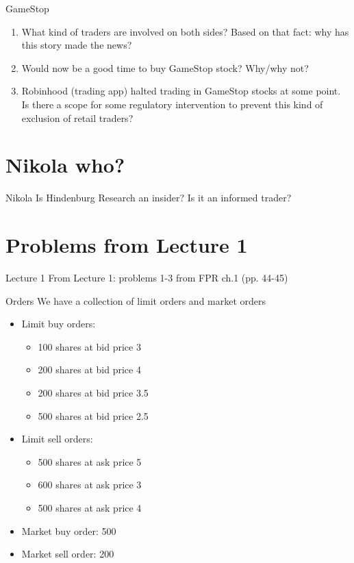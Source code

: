 \documentclass[english,10pt
,aspectratio=169
]{beamer}
\begin{document}
\begin{frame}{GameStop}
	\begin{enumerate}
		\item What kind of traders are involved on both sides? Based on that fact: why has this story made the news?
		\item Would now be a good time to buy GameStop stock? Why/why not?
		\item Robinhood (trading app) halted trading in GameStop stocks at some point. Is there a scope for some regulatory intervention to prevent this kind of exclusion of retail traders?
	\end{enumerate}
\end{frame}


\section{Nikola who?}

\begin{frame}{Nikola}
	Is Hindenburg Research an insider? Is it an informed trader? 
\end{frame}



\section{Problems from Lecture 1}

\begin{frame}{Lecture 1}
	From Lecture 1: problems 1-3 from FPR ch.1 (pp. 44-45)
\end{frame}


\begin{frame}{Orders}
	We have a collection of limit orders and market orders
	\begin{itemize}
		\item Limit buy orders:
		\begin{itemize}
			\item 100 shares at bid price 3
			\item 200 shares at bid price 4
			\item 200 shares at bid price 3.5
			\item 500 shares at bid price 2.5
		\end{itemize}
		\item Limit sell orders:
		\begin{itemize}
			\item 500 shares at ask price 5
			\item 600 shares at ask price 3
			\item 500 shares at ask price 4
		\end{itemize}
		\item Market buy order: 500
		\item Market sell order: 200
	\end{itemize}
\end{frame}
\end{document}
